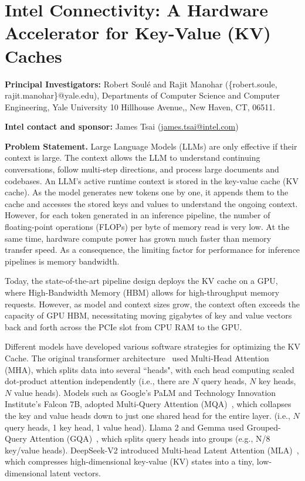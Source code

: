 \documentclass[11pt]{article}
\def\PAR#1{\par\medskip\noindent\textbf{#1}}
\begin{document}
\section*{Intel Connectivity: A Hardware Accelerator for Key-Value (KV) Caches}

\PAR{Principal Investigators:} Robert Soul{\'e} and Rajit Manohar
(\{robert.soule, rajit.manohar\}@yale.edu), Departments of Computer Science and Computer Engineering,
Yale University 10 Hillhouse Avenue,, New Haven, CT, 06511.

\PAR{Intel contact and sponsor:} James Tsai
  (\href{james.tsai@intel.com}{james.tsai@intel.com})



\PAR{Problem Statement.}
%
Large Language Models (LLMs) are only effective if their context is
large.  The context allows the LLM to understand continuing
conversations, follow multi-step directions, and process large
documents and codebases. An LLM's active runtime context is stored in
the key-value cache (KV cache).  As the model generates new tokens one
by one, it appends them to the cache and accesses the stored keys and
values to understand the ongoing context. However, for each token
generated in an inference pipeline, the number of floating-point
operations (FLOPs) per byte of memory read is very low. At the same
time, hardware compute power has grown much faster than memory
transfer speed. As a consequence, the limiting factor for performance
for inference pipelines is memory bandwidth.

Today, the state-of-the-art pipeline design deploys the KV cache on a
GPU, where High-Bandwidth Memory (HBM) allows for high-throughput
memory requests. However, as model and context sizes grow, the context
often exceeds the capacity of GPU HBM, necessitating moving gigabytes
of key and value vectors back and forth across the PCIe slot from CPU
RAM to the GPU.

Different models have developed various software strategies for
optimizing the KV Cache. The original transformer
architecture~\cite{vaswani2017} used Multi-Head Attention (MHA), which
splits data into several ``heads", with each head computing scaled
dot-product attention independently (i.e., there are $N$ query heads,
$N$ key heads, $N$ value heads).  Models such as Google's PaLM and
Technology Innovation Institute's Falcon 7B, adopted Multi-Query
Attention (MQA)~\cite{shazeer2019}, which collapses the key and value
heads down to just one shared head for the entire layer.  (i.e., $N$
query heads, 1 key head, 1 value head).  Llama 2 and Gemma used
Grouped-Query Attention (GQA)~\cite{ainslie2023}, which splits query
heads into groups (e.g., N/8 key/value heads).  DeepSeek-V2 introduced
Multi-head Latent Attention (MLA)~\cite{deepseekv2}, which compresses
high-dimensional key-value (KV) states into a tiny, low-dimensional
latent vectors.
\end{document}
